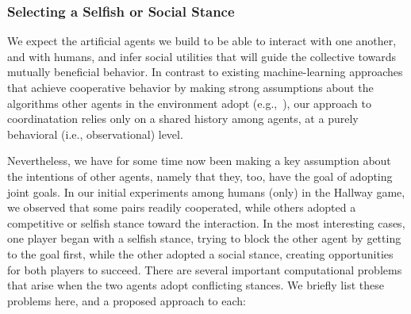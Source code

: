 
\subsubsection*{\large Selecting a Selfish or Social Stance}
\label{sec:stance}

We expect the artificial agents we build to be able to interact with
one another, and with humans, and infer social utilities that will
guide the collective towards mutually beneficial behavior.  In
contrast to existing machine-learning approaches that achieve
cooperative behavior by making strong assumptions about the algorithms
other agents in the environment adopt (e.g.,~\cite{conitzer07}), our
approach to coordinatation relies only on a shared history among
agents, at a purely behavioral (i.e., observational) level.

Nevertheless, we have for some time now been making a key assumption
about the intentions of other agents, namely that they, too, have the
goal of adopting joint goals.  In our initial experiments among humans
(only) in the Hallway game, we observed that some pairs readily
cooperated, while others adopted a competitive or selfish stance
toward the interaction.  In the most interesting cases, one player
began with a selfish stance, trying to block the other agent by
getting to the goal first, while the other adopted a social stance,
creating opportunities for both players to succeed. There are several
important computational problems that arise when the
two agents adopt conflicting stances.  We briefly list these problems
here, and a proposed approach to each:

